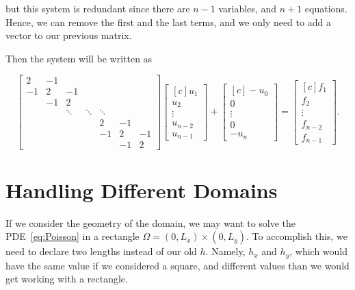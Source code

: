 \documentclass[fontsize=11pt,paper=a4,titlepage]{article}
\begin{document}
but this system is redundant since there are $n - 1$ variables, and $n + 1$
equations. Hence, we can remove the first and the last terms, and we only need
to add a vector to our previous matrix.

Then the system will be written as

\begin{displaymath}
\begin{bmatrix}
	2 & -1 &  &  &  &  &  \\
	-1 & 2 & -1 &  &  &  &  \\
	 & -1 & 2 &  &  &  &  \\
	 &  & \ddots & \ddots & \ddots &  & \\
	 &  &  &  & 2 & -1 &  \\
	 &  &  &  & -1 & 2 & -1 \\
	 &  &  &  &  & -1 & 2
\end{bmatrix}
\begin{bmatrix*}[c]
	u_1 \\
	u_2 \\
	\vdots \\
	u_{n - 2} \\
	u_{n - 1}
\end{bmatrix*}
+ \begin{bmatrix*}[c]
	- u_0 \\
	0 \\
	\vdots \\
	0 \\
	- u_n
\end{bmatrix*}
=
\begin{bmatrix*}[c]
	f_1 \\
	f_2 \\
	\vdots \\
	f_{n - 2} \\
	f_{n - 1}
\end{bmatrix*}.
\end{displaymath}

\section{Handling Different Domains}

If we consider the geometry of the domain, we may want to solve the
PDE~\ref{eq:Poisson} in a rectangle $\Omega = (0, L_x) \times (0, L_y)$. To
accomplish this, we need to declare two lengths instead of our old $h$. Namely,
$h_x$ and $h_y$, which would have the same value if we considered a square, and
different values than we would get working with a rectangle.
\end{document}
